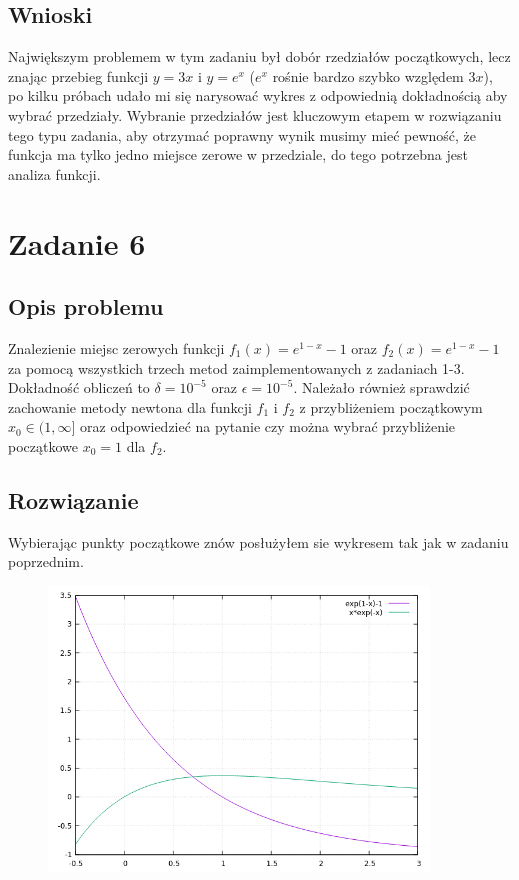\documentclass[12pt, a4paper]{article}
\begin{document}
\subsection{Wnioski}
Największym problemem w tym zadaniu był dobór rzedziałów początkowych, lecz znając przebieg funkcji $y = 3x$ i $y = e^{x}$ ($e^{x}$ rośnie bardzo szybko względem $3x$), po kilku próbach udało mi się narysować wykres z odpowiednią dokładnością aby wybrać przedziały.  Wybranie przedziałów jest kluczowym etapem w rozwiązaniu tego typu zadania, aby otrzymać poprawny wynik musimy mieć pewność, że funkcja ma tylko jedno miejsce zerowe w przedziale, do tego potrzebna jest analiza funkcji.

\newpage

\section{Zadanie 6}

\subsection{Opis problemu}
Znalezienie miejsc zerowych funkcji $f_{1}(x) = e^{1-x}-1$  oraz $f_{2}(x) = e^{1-x}-1$ za pomocą wszystkich trzech metod zaimplementowanych z zadaniach 1-3. Dokładność obliczeń to $\delta=10^{-5}$ oraz $\epsilon=10^{-5}$.
Należało również sprawdzić zachowanie metody newtona dla funkcji $f_{1}$ i $f_{2}$ z przybliżeniem początkowym $x_{0} \in{(1, \infty]}$ oraz odpowiedzieć na pytanie czy można wybrać przybliżenie początkowe $x_{0}=1$ dla $f_{2}$.

\subsection{Rozwiązanie}
Wybierając punkty początkowe znów posłużyłem sie wykresem tak jak w zadaniu poprzednim.

\begin{figure}[h]
\centering
\includegraphics[width=0.9\textwidth]{zad6.png}\hfill
\end{figure} 
\end{document}
